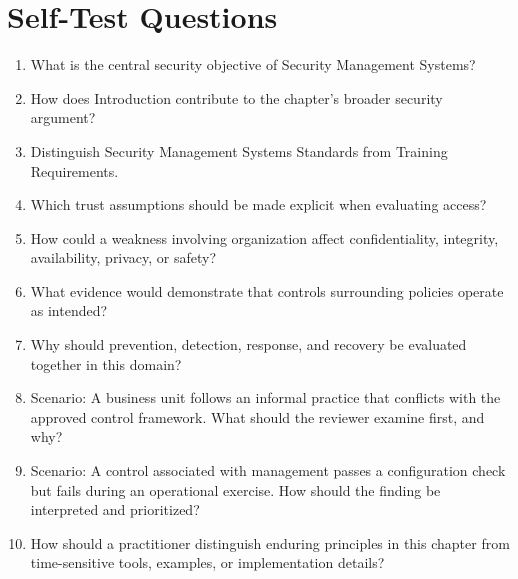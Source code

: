 \documentclass[11pt]{article}
\begin{document}
\section*{Self-Test Questions}
\begin{enumerate}
\item What is the central security objective of Security Management Systems?
\item How does Introduction contribute to the chapter's broader security argument?
\item Distinguish Security Management Systems Standards from Training Requirements.
\item Which trust assumptions should be made explicit when evaluating access?
\item How could a weakness involving organization affect confidentiality, integrity, availability, privacy, or safety?
\item What evidence would demonstrate that controls surrounding policies operate as intended?
\item Why should prevention, detection, response, and recovery be evaluated together in this domain?
\item Scenario: A business unit follows an informal practice that conflicts with the approved control framework. What should the reviewer examine first, and why?
\item Scenario: A control associated with management passes a configuration check but fails during an operational exercise. How should the finding be interpreted and prioritized?
\item How should a practitioner distinguish enduring principles in this chapter from time-sensitive tools, examples, or implementation details?
\end{enumerate}
\end{document}
